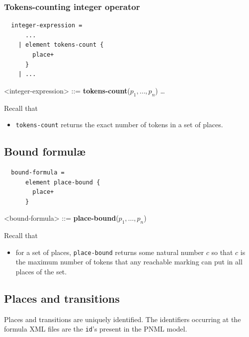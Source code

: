 \documentclass[10pt,english,a4paper]{article}
\newcommand\set[1]           {{\{ #1 \mathclose \}}}
\newcommand\N                {\mathbb{N}}
\newcommand\atomplacebnd[1]  {\textbf{place-bound}(#1)}
\newcommand\atomtokenscnt[1] {\textbf{tokens-count}(#1)}
\newcommand\mysubsection[1]{\color{sectioncolor}\subsection{#1}\color{defaultcolor}}
\begin{document}
\subsubsection{Tokens-counting integer operator}

\begin{multicols}{2}
\begin{lstlisting}
  integer-expression =
      ...
    | element tokens-count {
        place+
      }
    | ...
\end{lstlisting}
\columnbreak
\begin{grammar}
<integer-expression> ::=
     \atomtokenscnt{$p_1, \ldots, p_n$}
\alt \ldots
\end{grammar}
\end{multicols}

Recall that
\begin{itemize}
  \item \lstinline!tokens-count! returns the exact number of tokens in a set of places.
\end{itemize}

\mysubsection{Bound formulæ}

\begin{multicols}{2}
\begin{lstlisting}
  bound-formula =
      element place-bound {
        place+
      }
\end{lstlisting}
\columnbreak
\begin{grammar}
<bound-formula> ::=
     \atomplacebnd{$p_1, \ldots, p_n$}
\end{grammar}
\end{multicols}

Recall that
\begin{itemize}
\item for a set of places, \lstinline!place-bound! returns some
natural number $c$ so that $c$ is the maximum number of tokens that any reachable marking can put in all places of the set.
\end{itemize}

\mysubsection{Places and transitions}

Places and transitions are uniquely identified. The identifiers occurring at
the formula XML files are the \texttt{id}'s present in the PNML model.
\end{document}
